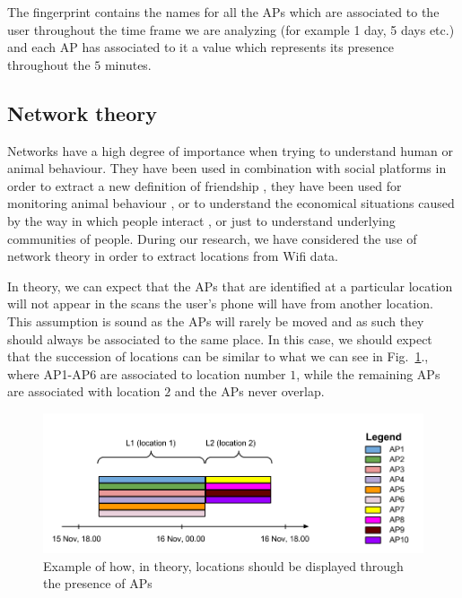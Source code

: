 The fingerprint contains the names for all the APs which are associated to the
user throughout the time frame we are analyzing (for example 1 day, 5 days etc.)
and each AP has associated to it a value which represents its presence
throughout the $5$ minutes.

\subsection{Network theory}

Networks have a high degree of importance when trying to understand human or
animal behaviour. They have been used in combination with social platforms in
order to extract a new definition of friendship \cite{cho2011friendship}, they
have been used for monitoring animal behaviour \cite{4116628}, or to understand
the economical situations caused by the way in which people interact
\cite{Copic05identifyingcommunity}, or just to understand underlying communities
of people. During our research, we have considered the use of network theory in
order to extract locations from Wifi data.

In theory, we can expect that the APs that are identified at a particular
location will not appear in the scans the user's phone will have from another
location. This assumption is sound as the APs will rarely be moved and as such
they should always be associated to the same place. In this case, we should
expect that the succession of locations can be similar to what we can see in
Fig.~\ref{user_6_tn}., where AP1-AP6 are associated to location number $1$,
while the remaining APs are associated with location $2$ and the APs never
overlap.

\begin{figure}[!h]
\centering
\includegraphics[width=1\textwidth]{figures/networks/theoretical_network.png}
\caption{Example of how, in theory, locations should be displayed through the
presence of APs}
\label{user_6_tn}
\end{figure}

